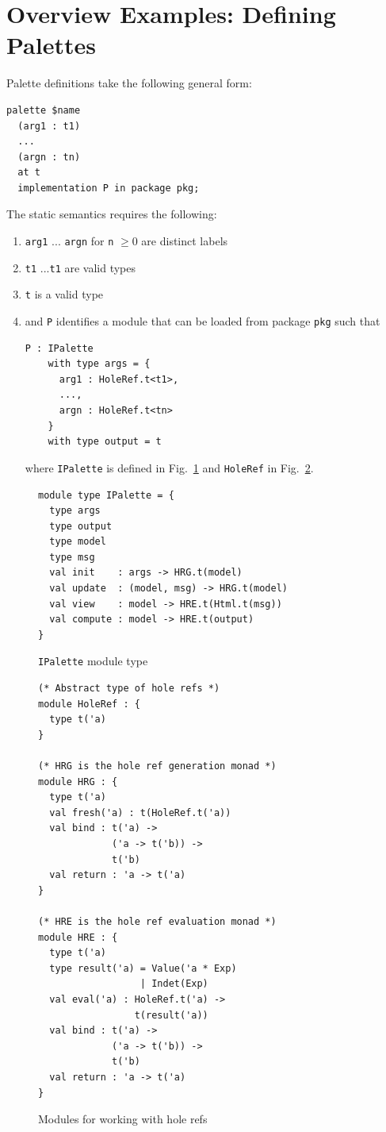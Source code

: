 \documentclass[acmsmall,review,anonymous,nonacm]{acmart}
\newcommand{\li}[1]{\lstinline[basicstyle=\ttfamily\fontsize{9pt}{1em}\selectfont]{#1}}
\theoremstyle{slplain}
\numberwithin{thm}{section}
\begin{document}

\section{Overview Examples: Defining Palettes}

Palette definitions take the following general form:
\begin{lstlisting}
palette $name 
  (arg1 : t1) 
  ... 
  (argn : tn) 
  at t 
  implementation P in package pkg;
\end{lstlisting}
The static semantics requires the following:
\begin{enumerate}
\item \li{arg1} ... \li{argn} for \li{n} $\geq 0$ are distinct labels
\item \li{t1} ...\li{t1} are valid types
\item \li{t} is a valid type
\item and \li{P} identifies a module that can be loaded from package \li{pkg} such that \begin{lstlisting}
P : IPalette
    with type args = { 
      arg1 : HoleRef.t<t1>, 
      ..., 
      argn : HoleRef.t<tn> 
    } 
    with type output = t
\end{lstlisting}
where \li{IPalette} is defined in Fig.~\ref{fig:IPalette} and \li{HoleRef} in Fig.~\ref{fig:HoleRefs}.
\end{enumerate}

\begin{figure}
\begin{lstlisting}
module type IPalette = {
  type args
  type output
  type model
  type msg
  val init    : args -> HRG.t(model)
  val update  : (model, msg) -> HRG.t(model)
  val view    : model -> HRE.t(Html.t(msg))
  val compute : model -> HRE.t(output)
}
\end{lstlisting}
\caption{\li{IPalette} module type}
\label{fig:IPalette}
\end{figure}

\begin{figure}
\begin{lstlisting}
(* Abstract type of hole refs *)
module HoleRef : {
  type t('a)
}

(* HRG is the hole ref generation monad *)
module HRG : {
  type t('a)
  val fresh('a) : t(HoleRef.t('a))
  val bind : t('a) -> 
             ('a -> t('b)) -> 
             t('b)
  val return : 'a -> t('a)
}

(* HRE is the hole ref evaluation monad *)
module HRE : {
  type t('a) 
  type result('a) = Value('a * Exp)
                  | Indet(Exp)
  val eval('a) : HoleRef.t('a) -> 
                 t(result('a))
  val bind : t('a) -> 
             ('a -> t('b)) -> 
             t('b)
  val return : 'a -> t('a)
}
\end{lstlisting}
\caption{Modules for working with hole refs}
\label{fig:HoleRefs}
\end{figure}
\end{document}
